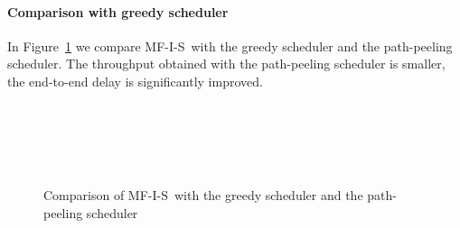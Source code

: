 \documentclass[12pt]{article}
\newenvironment{proof sketch}[1]{\noindent {\emph{Proof sketch of #1:}}}{\hfill \qed}
\newcommand{\algA}{\textsc{MF-I-S}}
\begin{document}
\paragraph{Comparison with greedy scheduler}
In Figure~\ref{fig:big3} we compare \algA\ with the greedy scheduler
and the path-peeling scheduler.  The throughput obtained with the
path-peeling scheduler is smaller, the end-to-end delay is
significantly improved.

\begin{figure}[h!]
  \centering
  \\
  \\
  \\
  \\
  \label{fig:big3}
\caption{Comparison of \algA\ with the greedy scheduler and the path-peeling scheduler}
     \end{figure}
\end{document}

